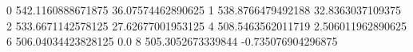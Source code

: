 0 542.1160888671875 36.07574462890625
1 538.8766479492188 32.8363037109375
2 533.6671142578125 27.62677001953125
4 508.5463562011719 2.506011962890625
6 506.04034423828125 0.0
8 505.3052673339844 -0.735076904296875
